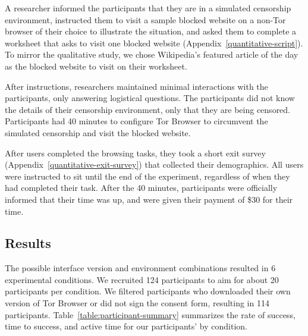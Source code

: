 \documentclass[USenglish,oneside,twocolumn]{article}
\begin{document}
{A researcher informed the participants that they are in a
simulated censorship environment, instructed them to visit a sample blocked website on a 
non-Tor browser of their choice to illustrate the situation, and asked them to 
complete a worksheet that asks to visit one blocked website (Appendix~\ref{quantitative-script}). 
To mirror the qualitative study, we chose Wikipedia's featured article of the day 
as the blocked website to visit on their worksheet. 

After instructions, researchers maintained minimal interactions with the participants, 
only answering logistical questions.
The participants did not know the details of their censorship environment,
only that they are being censored. Participants had 40 minutes to configure Tor Browser to 
circumvent the simulated censorship and visit the blocked website. 

After users completed the browsing tasks, they took a short exit survey (Appendix~\ref{quantitative-exit-survey})
that collected their demographics. All users were instructed to sit until the end of the experiment,
regardless of when they had completed their task. After the 40 minutes, 
participants were officially informed that their time was up, and were given their payment of 
\$30 for their time. 

\subsection{Results} 
The possible interface version and environment combinations resulted in 6 experimental conditions. We recruited 124 participants to aim for about 20 participants per condition. We filtered participants who downloaded their own version of Tor Browser or did not sign the consent form, resulting in 114 participants. Table~\ref{table:participant-summary} summarizes the rate of success, time to success, and active time for our participants' by condition. 


}
\end{document}
